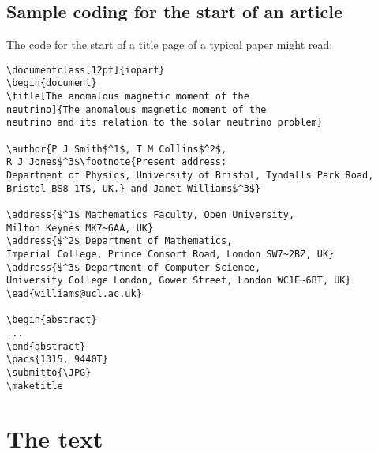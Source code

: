 \documentclass[12pt]{iopart}
\begin{document}
\subsection{Sample coding for the start of an article}
\label{startsample}
The code for the start of a title page of a typical paper might read:
\small\begin{verbatim}
\documentclass[12pt]{iopart}
\begin{document}
\title[The anomalous magnetic moment of the 
neutrino]{The anomalous magnetic moment of the 
neutrino and its relation to the solar neutrino problem}

\author{P J Smith$^1$, T M Collins$^2$, 
R J Jones$^3$\footnote{Present address:
Department of Physics, University of Bristol, Tyndalls Park Road, 
Bristol BS8 1TS, UK.} and Janet Williams$^3$}

\address{$^1$ Mathematics Faculty, Open University, 
Milton Keynes MK7~6AA, UK}
\address{$^2$ Department of Mathematics, 
Imperial College, Prince Consort Road, London SW7~2BZ, UK}
\address{$^3$ Department of Computer Science, 
University College London, Gower Street, London WC1E~6BT, UK}
\ead{williams@ucl.ac.uk}

\begin{abstract}
...
\end{abstract}
\pacs{1315, 9440T}
\submitto{\JPG}
\maketitle
\end{verbatim}
\normalsize

\section{The text}
\end{document}
